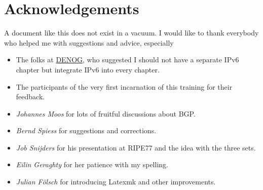 \chapter{Acknowledgements}
A document like this does not exist in a vacuum. I would like to thank everybody who helped me with suggestions and advice, especially
\begin{itemize}
  \item The folks at \href{https://www.denog.de}{DENOG}, who suggested I should not have a separate IPv6 chapter but integrate IPv6 into every chapter.
  \item The participants of the very first incarnation of this training for their feedback.
  \item \emph{Johannes Moos} for lots of fruitful discussions about BGP.
  \item \emph{Bernd Spiess} for suggestions and corrections.
  \item \emph{Job Snijders} for his presentation at RIPE77 and the idea with the three sets.
  \item \emph{Eilin Geraghty} for her patience with my spelling.
  \item \emph{Julian Fölsch} for introducing Latexmk and other improvements.
\end{itemize}
